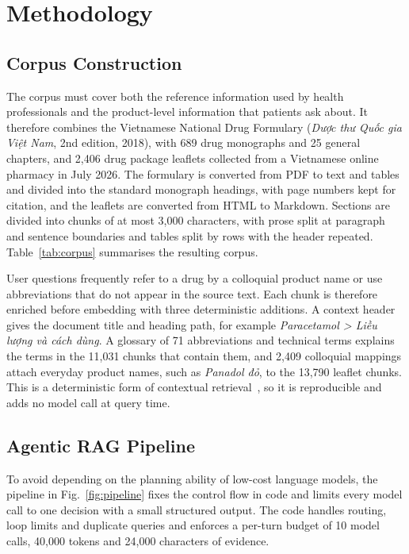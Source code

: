 \section{Methodology}\label{sec:method}
\suppressfloats[t]

\subsection{Corpus Construction}\label{sec:corpus}

The corpus must cover both the reference information used by health professionals and the product-level information that patients ask about. It therefore combines the Vietnamese National Drug Formulary (\textit{Dược thư Quốc gia Việt Nam}, 2nd edition, 2018), with 689 drug monographs and 25 general chapters, and 2{,}406 drug package leaflets collected from a Vietnamese online pharmacy in July 2026. The formulary is converted from PDF to text and tables and divided into the standard monograph headings, with page numbers kept for citation, and the leaflets are converted from HTML to Markdown. Sections are divided into chunks of at most 3{,}000 characters, with prose split at paragraph and sentence boundaries and tables split by rows with the header repeated. Table~\ref{tab:corpus} summarises the resulting corpus.



User questions frequently refer to a drug by a colloquial product name or use abbreviations that do not appear in the source text. Each chunk is therefore enriched before embedding with three deterministic additions. A context header gives the document title and heading path, for example \textit{Paracetamol > Liều lượng và cách dùng}. A glossary of 71 abbreviations and technical terms explains the terms in the 11{,}031 chunks that contain them, and 2{,}409 colloquial mappings attach everyday product names, such as \textit{Panadol đỏ}, to the 13{,}790 leaflet chunks. This is a deterministic form of contextual retrieval~\cite{anthropic2024contextual}, so it is reproducible and adds no model call at query time.

\subsection{Agentic RAG Pipeline}\label{sec:pipeline}



To avoid depending on the planning ability of low-cost language models, the pipeline in Fig.~\ref{fig:pipeline} fixes the control flow in code and limits every model call to one decision with a small structured output. The code handles routing, loop limits and duplicate queries and enforces a per-turn budget of 10 model calls, 40{,}000 tokens and 24{,}000 characters of evidence.

